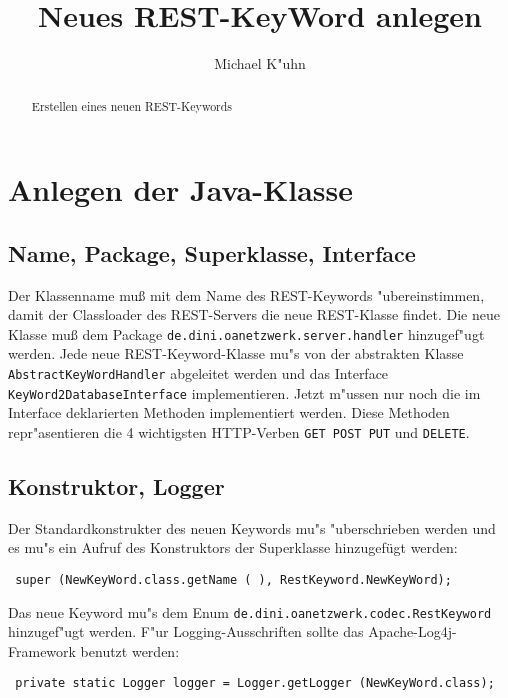 \documentclass[a4paper,12pt]{scrreprt}
\title{Neues REST-KeyWord anlegen}
\author{Michael K"uhn}
\begin{document}
\maketitle

\begin{abstract}
Erstellen eines neuen REST-Keywords
\end{abstract}

\chapter{Anlegen der Java-Klasse}
\section{Name, Package, Superklasse, Interface}
Der Klassenname muß mit dem Name des REST-Keywords "ubereinstimmen, damit der Classloader des REST-Servers die neue REST-Klasse findet.
Die neue Klasse muß dem Package \verb|de.dini.oanetzwerk.server.handler| hinzugef"ugt werden.
Jede neue REST-Keyword-Klasse mu"s von der abstrakten Klasse \verb|AbstractKeyWordHandler| abgeleitet werden und das Interface \verb|KeyWord2DatabaseInterface|
implementieren. Jetzt m"ussen nur noch die im Interface deklarierten Methoden implementiert werden. Diese Methoden repr"asentieren die 4 wichtigsten HTTP-Verben \verb|GET POST PUT| und \verb|DELETE|.
\section{Konstruktor, Logger}
Der Standardkonstrukter des neuen Keywords mu"s "uberschrieben werden und es mu"s ein Aufruf des Konstruktors der Superklasse hinzugefügt werden:
\begin{verbatim}
 super (NewKeyWord.class.getName ( ), RestKeyword.NewKeyWord);
\end{verbatim}
Das neue Keyword mu"s dem Enum \verb|de.dini.oanetzwerk.codec.RestKeyword| hinzugef"ugt werden.
F"ur Logging-Ausschriften sollte das Apache-Log4j-Framework benutzt werden:
\begin{verbatim}
 private static Logger logger = Logger.getLogger (NewKeyWord.class);
\end{verbatim}
\end{document}
